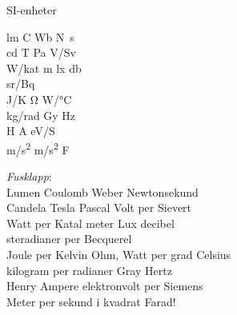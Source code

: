 \begin{song}{SI-enheter}
	
	
	
	\si{\lumen} \si{\coulomb} \si{\weber} \si{\newton\second}\\
	\si{\candela} \si{\tesla} \si{\pascal} \si{\volt}/\si{\sievert}\\
	\si{\watt}/\si{\katal} \si{\meter} \si{\lux} \si{\decibel}\\
	\si{\steradian}/\si{\becquerel}\\
	\si{\joule}/\si{\kelvin} \si{\ohm} \si{\watt}/\si{\degreeCelsius}\\
	\si{\kilogram}/\si{\radian} \si{\gray} \si{\hertz}\\
	\si{\henry} \si{\ampere} \si{\electronvolt}/\si{\siemens}\\
	\si{\meter}/\si{\square\second} \si{\meter}/\si{\square\second} \si{\farad}

	\emph{Fusklapp}:\\
	Lumen Coulomb Weber Newtonsekund\\
	Candela Tesla Pascal Volt per Sievert\\
	Watt per Katal meter Lux decibel\\
	steradianer per Becquerel\\
	Joule per Kelvin Ohm, Watt per grad Celsius\\
	kilogram per radianer Gray Hertz\\
	Henry Ampere elektronvolt per Siemens\\
	\repetitionbegin{} Meter per sekund i kvadrat\repetitionend{} Farad!
	
\end{song}

